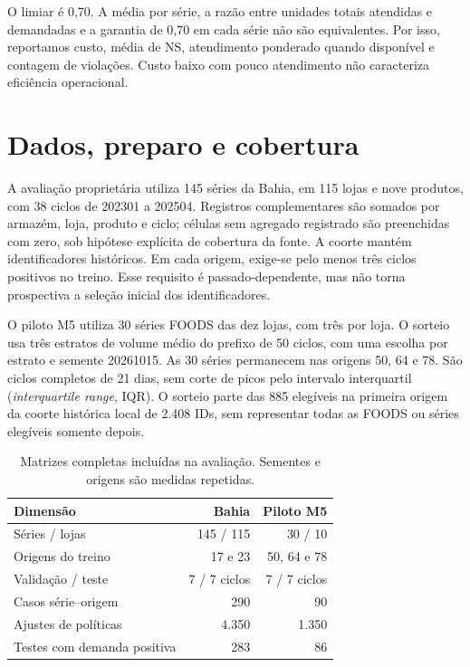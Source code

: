 O limiar é 0,70. A média por série, a razão entre unidades totais atendidas e demandadas e a garantia de 0,70 em cada série não são equivalentes. Por isso, reportamos custo, média de NS, atendimento ponderado quando disponível e contagem de violações. Custo baixo com pouco atendimento não caracteriza eficiência operacional.

\section{Dados, preparo e cobertura}
\label{sec:pipeline_experimental}\label{sec:ba2026_methods}
A avaliação proprietária utiliza 145 séries da Bahia, em 115 lojas e nove produtos, com 38 ciclos de 202301 a 202504. Registros complementares são somados por armazém, loja, produto e ciclo; células sem agregado registrado são preenchidas com zero, sob hipótese explícita de cobertura da fonte. A coorte mantém identificadores históricos. Em cada origem, exige-se pelo menos três ciclos positivos no treino. Esse requisito é passado-dependente, mas não torna prospectiva a seleção inicial dos identificadores.

O piloto M5 utiliza 30 séries FOODS das dez lojas, com três por loja. O sorteio usa três estratos de volume médio do prefixo de 50 ciclos, com uma escolha por estrato e semente 20261015. As 30 séries permanecem nas origens 50, 64 e 78. São ciclos completos de 21 dias, sem corte de picos pelo intervalo interquartil (\textit{interquartile range}, IQR). O sorteio parte das 885 elegíveis na primeira origem da coorte histórica local de 2.408 IDs, sem representar todas as FOODS ou séries elegíveis somente depois.

\begin{table}[htbp]\centering\small
\caption{Matrizes completas incluídas na avaliação. Sementes e origens são medidas repetidas.}\label{tab:temporal_coverage}
\begin{tabular}{@{}lrr@{}}\toprule
Dimensão & Bahia & Piloto M5\\\midrule
Séries / lojas & 145 / 115 & 30 / 10\\
Origens do treino & 17 e 23 & 50, 64 e 78\\
Validação / teste & 7 / 7 ciclos & 7 / 7 ciclos\\
Casos série--origem & 290 & 90\\
Ajustes de políticas & 4.350 & 1.350\\
Testes com demanda positiva & 283 & 86\\\bottomrule
\end{tabular}\end{table}

